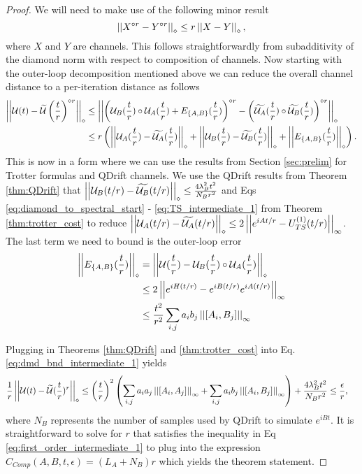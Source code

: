 \begin{proof}
We will need to make use of the following minor result 
\begin{equation}
    \left| \left| X^{\circ r} - Y^{\circ r} \right| \right|_\diamond \leq r \left| \left| X - Y \right| \right|_\diamond, \label{eq:err_to_err_per_iter}
\end{equation}
where $X$ and $Y$ are channels. This follows straightforwardly from subadditivity of the diamond norm with respect to composition of channels. Now starting with the outer-loop decomposition mentioned above we can reduce the overall channel distance to a per-iteration distance as follows
\begin{align}
    \left| \left| \mathcal{U}(t) - \widetilde{\mathcal{U}}\left( \frac{t}{r} \right)^{\circ r} \right| \right|_\diamond &\leq \left| \left| \left( \mathcal{U}_B(\frac{t}{r}) \circ \mathcal{U}_A(\frac{t}{r}) + E_{\left\{ A,B \right\}}(\frac{t}{r}) \right)^{\circ r} - \left( \widetilde{\mathcal{U}_A}(\frac{t}{r}) \circ \widetilde{\mathcal{U}_B}(\frac{t}{r}) \right)^{\circ r} \right| \right|_\diamond \\
    &\leq r \left(  \left| \left| \mathcal{U}_A(\frac{t}{r}) - \widetilde{\mathcal{U}_A}(\frac{t}{r}) \right| \right|_\diamond + \left| \left| \mathcal{U}_B(\frac{t}{r}) - \widetilde{\mathcal{U}_B}(\frac{t}{r}) \right| \right|_\diamond + \left| \left| E_{\left\{ A,B \right\}}(\frac{t}{r}) \right| \right|_\diamond  \right). \label{eq:dmd_bnd_intermediate_1}
\end{align}
This is now in a form where we can use the results from Section \ref{sec:prelim} for Trotter formulas and QDrift channels. We use the QDrift results from Theorem \ref{thm:QDrift} that $\left| \left| \mathcal{U}_B(t/r) - \widetilde{\mathcal{U}_B}(t/r) \right| \right|_\diamond \leq \frac{4 \lambda_B^2 t^2}{N_B r^2}$ and Eqs \eqref{eq:diamond_to_spectral_start} - \eqref{eq:TS_intermediate_1} from Theorem \ref{thm:trotter_cost}  to reduce $\left| \left| \mathcal{U}_A(t/r) - \widetilde{\mathcal{U}_A}(t/r) \right| \right|_\diamond \leq 2 \left| \left| e^{iAt/r} - {U_{TS}^{( 1 )}}(t/r) \right| \right|_{\infty}$. The last term we need to bound is the outer-loop error
\begin{align}
    \left| \left| E_{\left\{ A, B \right\}}(\frac{t}{r}) \right| \right|_\diamond &= \left| \left| \mathcal{U}(\frac{t}{r}) - \mathcal{U}_B(\frac{t}{r}) \circ \mathcal{U}_A(\frac{t}{r}) \right| \right|_\diamond \\
    &\leq 2 \left| \left| e^{i H (t/r)} - e^{i B (t/r)} e^{i A (t/r)} \right| \right|_{\infty} \\
    &\leq \frac{t^2}{r^2} \sum_{i,j} a_i b_j \left| \left| [A_i, B_j] \right| \right|_{\infty}
\end{align}

Plugging in Theorems \ref{thm:QDrift} and \ref{thm:trotter_cost} into Eq. \ref{eq:dmd_bnd_intermediate_1} yields
\begin{align}
    \frac{1}{r}\left| \left| \mathcal{U}(t) - \widetilde{\mathcal{U}}(\frac{t}{r})^r \right| \right|_\diamond &\leq \left( \frac{t}{r} \right)^2  \left( \sum_{i,j} a_i a_j \left| \left| [A_i, A_j] \right| \right|_{\infty} + \sum_{i, j} a_i b_j \left| \left| [A_i, B_j] \right| \right|_{\infty} \right) +  \frac{4 \lambda_B^2 t^2 }{N_B r^2} \leq \frac{\epsilon}{r}, \label{eq:first_order_intermediate_1}
\end{align}
where $N_B$ represents the number of samples used by QDrift to simulate $e^{iBt}$. It is straightforward to solve for $r$ that satisfies the inequality in Eq \eqref{eq:first_order_intermediate_1} to plug into the expression $C_{Comp}(A, B, t, \epsilon) = (L_A + N_B) r$ which yields the theorem statement. 
\end{proof}



